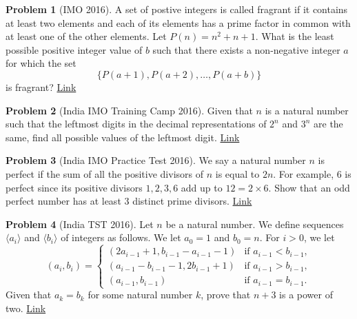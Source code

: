 \documentclass[]{article}
\theoremstyle{definition}
\newtheorem{problem}{Problem}
\begin{document}
\begin{problem}[IMO 2016]
	A set of postive integers is called fragrant if it contains at least two elements and each of its elements has a prime factor in common with at least one of the other elements. Let $P(n)=n^2+n+1$. What is the least possible positive integer value of $b$ such that there exists a non-negative integer $a$ for which the set $$\{P(a+1),P(a+2),\ldots,P(a+b)\}$$is fragrant? \hfill \href{http://artofproblemsolving.com/community/c6h1270992p6642559}{Link}
\end{problem}




\begin{problem}[India IMO Training Camp 2016]
	Given that $n$ is a natural number such that the leftmost digits in the decimal representations of $2^n$ and $3^n$ are the same, find all possible values of the leftmost digit. \hfill \href{http://artofproblemsolving.com/community/c6h1276412p6696449}{Link}
\end{problem}




\begin{problem}[India IMO Practice Test 2016]
	We say a natural number $n$ is perfect if the sum of all the positive divisors of $n$ is equal to $2n$. For example, $6$ is perfect since its positive divisors $1,2,3,6$ add up to $12=2\times 6$. Show that an odd perfect number has at least $3$ distinct prime divisors. \hfill \href{http://artofproblemsolving.com/community/c6h1276406p6696419}{Link}
\end{problem}







\begin{problem}[India TST 2016]
	Let $n$ be a natural number. We define sequences $\langle a_i\rangle$ and $\langle b_i\rangle$ of integers as follows. We let $a_0=1$ and $b_0=n$. For $i>0$, we let $$\left( a_i,b_i\right)=\begin{cases} \left(2a_{i-1}+1,b_{i-1}-a_{i-1}-1\right) & \text{if } a_{i-1}<b_{i-1},\\ \left( a_{i-1}-b_{i-1}-1,2b_{i-1}+1\right) & \text{if } a_{i-1}>b_{i-1},\\ \left(a_{i-1},b_{i-1}\right) & \text{if } a_{i-1}=b_{i-1}.\end{cases}$$ Given that $a_k=b_k$ for some natural number $k$, prove that $n+3$ is a power of two. \hfill \href{http://artofproblemsolving.com/community/c6h1276387p6696361}{Link}
\end{problem}
\end{document}
